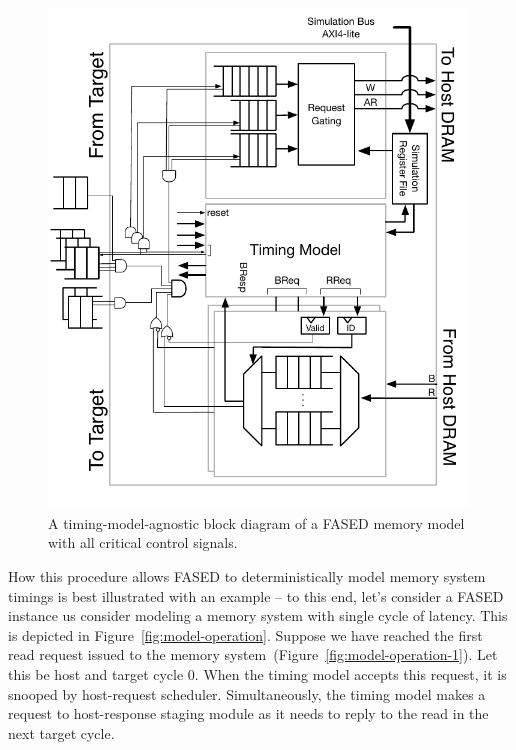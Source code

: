 \begin{figure}
    \centering
    \includegraphics[width=0.99\textwidth]{figures/fased-block-diagram.pdf}
    \caption{A timing-model-agnostic block diagram of a FASED memory model with
    all critical control signals.}
    \label{fig:fased-block-diagram}
\end{figure}

How this procedure allows FASED to deterministically model memory system
timings is best illustrated with an example -- to this end, let's consider a
FASED instance us consider modeling a memory system with single cycle of
latency. This is depicted in Figure~\ref{fig:model-operation}.  Suppose we have reached the first
read request issued to the memory system~(Figure~\ref{fig:model-operation-1}). Let this be host and
target cycle 0. When the timing model accepts this request, it is snooped by
host-request scheduler. Simultaneously, the timing model makes a request to
host-response staging module as it needs to reply to the read in the next
target cycle.

